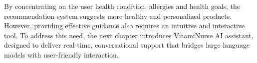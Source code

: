 By concentrating on the user health condition, allergies and health goals, the recommendation system suggests more healthy and personalized products. However, providing effective guidance also requires an intuitive and interactive tool. To address this need, the next chapter introduces VitamiNurse AI assistant, designed to deliver real-time, conversational support that bridges large language models with user-friendly interaction.  
